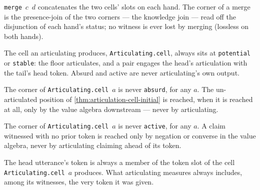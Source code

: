 \begin{proposition}\label{thm:cell-corner-merge}\leanok{}
\texttt{merge}~$c$~$d$ concatenates the two cells' slots on each hand. The
corner of a merge is the presence-join of the two corners --- the knowledge
join --- read off the disjunction of each hand's status; no witness is ever
lost by merging (lossless on both hands).
\end{proposition}

\begin{theorem}\label{thm:articulating-cell-corner-cases}\leanok{}
The cell an articulating produces, \texttt{Articulating.cell}, always sits at
\texttt{potential} or \texttt{stable}: the floor articulates, and a pair
engages the head's articulation with the tail's head token. Absurd and active
are never articulating's own output.
\end{theorem}

\begin{corollary}\label{thm:cell-corner-ne-absurd}\leanok{}
The corner of \texttt{Articulating.cell}~$a$ is never \texttt{absurd}, for any
$a$. The un-articulated position of \cref{thm:articulation-cell-initial} is
reached, when it is reached at all, only by the value algebra downstream ---
never by articulating.
\end{corollary}

\begin{corollary}\label{thm:cell-corner-ne-active}\leanok{}
The corner of \texttt{Articulating.cell}~$a$ is never \texttt{active}, for any
$a$. A claim witnessed with no prior token is reached only by negation or
converse in the value algebra, never by articulating claiming ahead of its
token.
\end{corollary}

\begin{proposition}\label{thm:head-token-mem-tokenslot}\leanok{}
The head utterance's token is always a member of the token slot of the cell
\texttt{Articulating.cell}~$a$ produces. What articulating measures always
includes, among its witnesses, the very token it was given.
\end{proposition}


